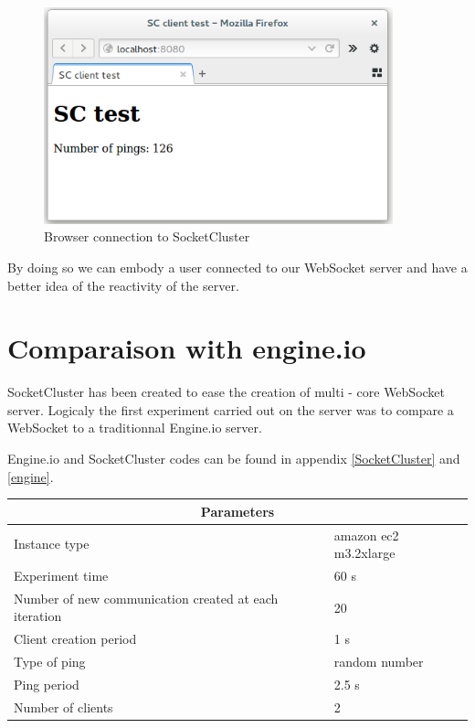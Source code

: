 \begin{figure}[H]
	\centering
		\includegraphics[width=0.9\textwidth]{./Figures/browser.png}
	\caption[Browser connection to SocketCluster]{Browser connection to SocketCluster}
	\label{fig:browser}
\end{figure}

By doing so we can embody a user connected to our WebSocket server and have a
better idea of the reactivity of the server.


\section{Comparaison with engine.io}

SocketCluster has been created to ease the creation of multi - core WebSocket
server. Logicaly the first experiment carried out on the server was to compare
a WebSocket to a traditionnal Engine.io server. 

Engine.io and SocketCluster codes can be found in appendix \ref{SocketCluster} and \ref{engine}. 

\begin{center}
  \begin{tabular}{ | l | l |}
  \hline
  \multicolumn{2}{|c|}{Parameters} \\
  \hline
    Instance type &  amazon ec2 m3.2xlarge\\ 
    Experiment time & 60 s \\
    Number of new communication created at each iteration & 20 \\
    Client creation period & 1 s \\
    Type of ping & random number \\ 
    Ping period & 2.5 s \\ 
    Number of clients & 2 \\
  \hline
  \end{tabular}
\end{center}

